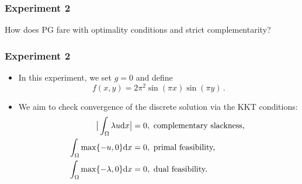 \documentclass[aspectratio=169,xcolor=dvipsnames,11pt]{beamer}
\newcommand{\dd}{\mathrm{d}}
\begin{document}
\begin{frame}\frametitle{Experiment 2}
\begin{center}
{\color{Maroon} \Large How does PG fare with optimality conditions and strict complementarity?}
\end{center}
\end{frame}

\begin{frame}\frametitle{Experiment 2}
\begin{itemize}
\item In this experiment, we set $g = 0$ and define 
\begin{equation}
\label{eq:StrictComplementarity_RHS}
	f(x,y)
	=
	2 \pi^2 \sin(\pi x)\sin(\pi y)
	\,.
\end{equation}
\item We aim to check convergence of the discrete solution via the KKT conditions:
 \[
 \aligned
 \big|\int_{\Omega} \lambda u \dd x\big| &= 0, \text{ complementary slackness, }\\
 \int_{\Omega} \max\{-u,0\} \dd x &= 0, \text{ primal feasibility, }\\
 \int_{\Omega} \max\{-\lambda,0\} \dd x &= 0, \text{ dual feasibility.}
 \endaligned
 \]

\end{itemize}
\end{frame}
\end{document}
